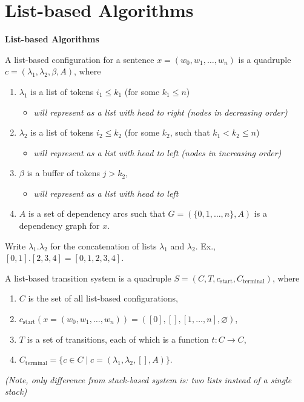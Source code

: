 \documentclass[10pt]{beamer}%
\theoremstyle{remark}
\begin{document}
\section{List-based Algorithms}

\begin{frame}

  \textbf{List-based Algorithms}

  \begin{definition}
    A \alert{list-based configuration} for a sentence $x = (w_0, w_1, \ldots, w_n)$ is a quadruple $c = (\lambda_1, \lambda_2,\beta, A)$, where
    \begin{enumerate}
      \item $\lambda_1$ is a list of tokens $i_1 \le k_1$ (for some $k_1 \le n$)
        \begin{itemize}
          \item \emph{will represent as a list with head to right (nodes in decreasing order)}
        \end{itemize}
      \item $\lambda_2$ is a list of tokens $i_2 \le k_2$ (for some $k_2$, such that $k_1 < k_2 \le n$)
        \begin{itemize}
          \item \emph{will represent as a list with head to left (nodes in increasing order)}
        \end{itemize}
      \item $\beta$ is a buffer of tokens $j > k_2$,
        \begin{itemize}
          \item \emph{will represent as a list with head to left}
        \end{itemize}
      \item $A$ is a set of dependency arcs such that $G = (\{0, 1, \ldots, n\}, A)$ is a dependency graph for $x$.
    \end{enumerate}
  \end{definition}

  Write $\lambda_1.\lambda_2$ for the concatenation of lists $\lambda_1$ and $\lambda_2$. Ex., $[0, 1].[2, 3, 4] = [0, 1, 2, 3, 4]$.

  \begin{definition}
    A \alert{list-based transition system} is a quadruple $S = (C, T, c_\mathrm{start} , C_\mathrm{terminal})$, where
    \begin{enumerate}
      \item $C$ is the set of all list-based configurations,
      \item $c_\mathrm{start}(x = (w_0,w_1,\ldots,w_n)) = ([0],[],[1,\ldots,n],\varnothing)$,
      \item $T$ is a set of transitions, each of which is a function $t : C \to C$,
      \item $C_\mathrm{terminal} = \{c \in C \mid c = (\lambda_1,\lambda_2,[],A)\}$.
    \end{enumerate}
    \emph{(Note, only difference from stack-based system is: two lists instead of a single stack)}
  \end{definition}
\end{frame}
\end{document}
